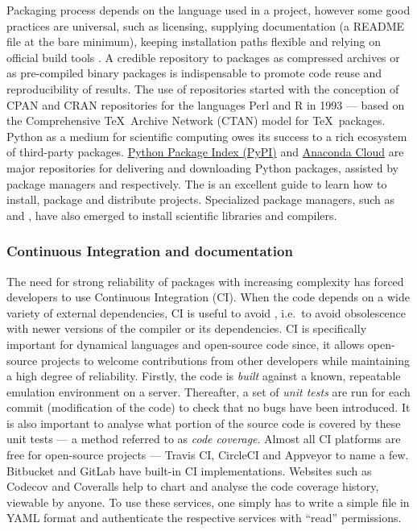 Packaging process depends on the language used in a project, however some good
practices are universal, such as licensing, supplying documentation (a README
file at the bare minimum), keeping installation paths flexible and relying on
official build tools \citep{taschuk_ten_2017}.
%
A credible repository to packages as compressed archives or as pre-compiled binary
packages is indispensable to promote code reuse and reproducibility of results.
%
The use of repositories started with the conception of
CPAN and CRAN repositories for the languages Perl and R in 1993 --- based on
the Comprehensive \TeX\ Archive Network (CTAN) model for \TeX\ packages.
%
Python as a medium for scientific computing owes its success to a rich
ecosystem of third-party packages. \href{https://pypi.org}{Python Package
Index (PyPI)} and \href{https://anaconda.org}{Anaconda Cloud} are major
repositories for delivering and downloading Python packages, assisted by
package managers  and  respectively. The
 is an
excellent guide to learn how to install, package and distribute projects.
Specialized package managers, such as  and , have
also emerged to install scientific libraries and compilers.

\subsubsection{Continuous Integration and documentation} The need for
strong reliability of packages with increasing complexity has forced developers
to use Continuous Integration (CI).
%
When the code depends on a wide variety of external dependencies, CI is useful
to avoid ,
i.e.\ to avoid obsolescence with newer versions of the compiler or its
dependencies. CI is specifically important for dynamical languages and
open-source code since, it allows open-source projects to welcome contributions
from other developers while maintaining a high degree of reliability.
%
Firstly, the code is \emph{built} against a known, repeatable emulation
environment on a server. Thereafter, a set of \emph{unit tests} are run for
each commit (modification of the code) to check that no bugs have been
introduced. It is also important to analyse what portion of the source code is
covered by these unit tests --- a method referred to as \emph{code coverage}.
%
Almost all CI platforms are free for open-source projects --- Travis CI,
CircleCI and Appveyor to name a few. Bitbucket and GitLab have built-in CI
implementations. Websites such as Codecov and Coveralls help to chart and
analyse the code coverage history, viewable by anyone. To use these services,
one simply has to write a simple file in YAML format and authenticate the
respective services with ``read'' permissions.

